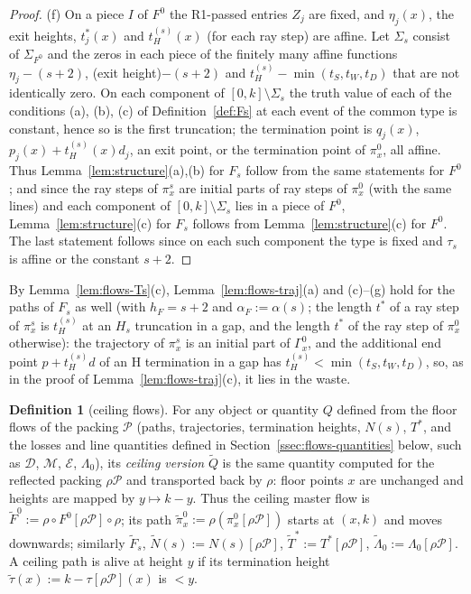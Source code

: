 \documentclass[11pt]{amsart}
\newcommand{\cE}{\mathcal E}
\newcommand{\Lam}{\Lambda}
\newcommand{\Fz}{F^{0}}
\newcommand{\Fs}{F_{s}}
\newcommand{\Tstar}{T^{*}}
\theoremstyle{definition}
\newtheorem{definition}[theorem]{Definition}
\theoremstyle{remark}
\numberwithin{equation}{section}
\begin{document}
\begin{proof}
(f) On a piece $I$ of $\Fz$ the R1-passed entries $Z_j$ are fixed, and $\eta_j(x)$, the exit heights, $t^*_j(x)$ and
$t^{(s)}_H(x)$ (for each ray step) are affine. Let $\Sigma_s$ consist of $\Sigma_{\Fz}$ and the zeros in each piece of the
finitely many affine functions $\eta_j-(s+2)$, (exit height)$-(s+2)$ and $t^{(s)}_H-\min(t_S,t_W,t_D)$ that are not
identically zero. On each component of $[0,k]\setminus\Sigma_s$ the truth value of each of the conditions (a), (b), (c) of
Definition~\ref{def:Fs} at each event of the common type is constant, hence so is the first truncation; the termination
point is $q_j(x)$, $p_j(x)+t^{(s)}_H(x)d_j$, an exit point, or the termination point of $\pi^0_x$, all affine. Thus
Lemma~\ref{lem:structure}(a),(b) for $\Fs$ follow from the same statements for $\Fz$; and since the ray steps of
$\pi^s_x$ are initial parts of ray steps of $\pi^0_x$ (with the same lines) and each component of $[0,k]\setminus\Sigma_s$
lies in a piece of $\Fz$, Lemma~\ref{lem:structure}(c) for $\Fs$ follows from Lemma~\ref{lem:structure}(c) for $\Fz$.
The last statement follows since on each such component the type is fixed and $\tau_s$ is affine or the constant $s+2$.
\end{proof}

By Lemma~\ref{lem:flows-Ts}(c), Lemma~\ref{lem:flows-traj}(a) and (c)--(g) hold for the paths of $\Fs$ as well
(with $h_F=s+2$ and $\alpha_F:=\alpha(s)$; the length $t^*$ of a ray step of $\pi^s_x$ is $t^{(s)}_H$ at an $H_s$
truncation in a gap, and the length $t^*$ of the ray step of $\pi^0_x$ otherwise): the trajectory of $\pi^s_x$ is an initial part of $\Gamma^0_x$, and the additional end point
$p+t^{(s)}_Hd$ of an H termination in a gap has $t^{(s)}_H<\min(t_S,t_W,t_D)$, so, as in the proof of
Lemma~\ref{lem:flows-traj}(c), it lies in the waste.

\begin{definition}[ceiling flows]\label{def:flows-ceiling}
For any object or quantity $Q$ defined from the floor flows of the packing $\mathcal P$ (paths, trajectories,
termination heights, $N(s)$, $\Tstar$, and the losses and line quantities defined in Section~\ref{ssec:flows-quantities}
below, such as $\mathcal D$, $\mathcal M$, $\cE$, $\Lam_0$), its \emph{ceiling version} $\tilde Q$ is the same quantity computed
for the reflected packing $\rho\mathcal P$ and transported back by $\rho$: floor points $x$ are unchanged and heights are
mapped by $y\mapsto k-y$. Thus the ceiling master flow is $\tilde F^0:=\rho\circ\Fz[\rho\mathcal P]\circ\rho$; its path
$\tilde\pi^0_x:=\rho(\pi^0_x[\rho\mathcal P])$ starts at $(x,k)$ and moves downwards; similarly $\tilde F_s$,
$\tilde N(s):=N(s)[\rho\mathcal P]$, $\tilde T^*:=\Tstar[\rho\mathcal P]$, $\tilde\Lam_0:=\Lam_0[\rho\mathcal P]$. A
ceiling path is alive at height $y$ if its termination height $\tilde\tau(x):=k-\tau[\rho\mathcal P](x)$ is $<y$.
\end{definition}
\end{document}
